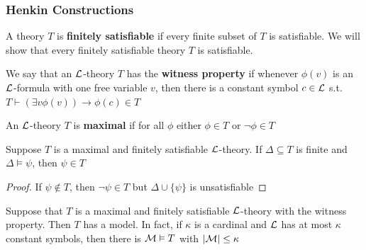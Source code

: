 \documentclass[11pt]{article}
\begin{document}
\subsubsection{Henkin Constructions}
\label{sec:orge92ada6}
A theory \(T\) is \textbf{finitely satisfiable} if every finite subset of \(T\) is
satisfiable. We will show that every finitely satisfiable theory \(T\) is
satisfiable.

\begin{definition}[]
We say that an \(\mathcal{L}\)-theory \(T\) has the \textbf{witness property} if whenever
\(\phi(v)\) is an \(\mathcal{L}\)-formula with one free variable \(v\), then there is
a constant symbol \(c\in\mathcal{L}\) s.t. \(T\vdash(\exists v\phi(v))\to\phi(c)\in T\)

An \(\mathcal{L}\)-theory \(T\) is \textbf{maximal} if for all \(\phi\) either \(\phi\in T\) or
\(\neg\phi\in T\)
\end{definition}

\begin{lemma}[]
\label{lemma2.1.6}
Suppose \(T\) is a maximal and finitely satisfiable \(\mathcal{L}\)-theory. If
\(\Delta\subseteq T\) is finite and \(\Delta\vDash\psi\), then \(\psi\in T\)
\end{lemma}

\begin{proof}
If \(\psi\not\in T\), then \(\neg\psi\in T\) but \(\Delta\cup\{\psi\}\) is
unsatisfiable 
\end{proof}

\begin{lemma}[]
\label{lemma2.1.7}
Suppose that \(T\) is a maximal and finitely satisfiable \(\mathcal{L}\)-theory with
the witness property. Then \(T\) has a model. In fact, if \(\kappa\) is a cardinal
and \(\mathcal{L}\) has at most \(\kappa\) constant symbols, then there is
\(\mathcal{M}\vDash T\) with \(\abs{\calm}\le\kappa\)
\end{lemma}
\end{document}
